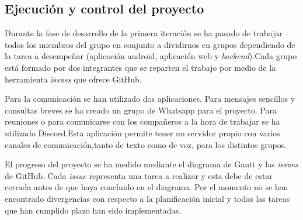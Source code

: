 \documentclass{article}
\begin{document}
\subsection{Ejecución y control del proyecto}

Durante la fase de desarrollo de la primera iteración se ha pasado de trabajar todos los miembros del grupo en conjunto a dividirnos en grupos dependiendo de la tarea a desempeñar (aplicación android, aplicación web y \textit{backend}).Cada grupo está formado por dos integrantes que se reparten el trabajo por medio de la herramienta \textit{issues} que ofrece GitHub.

Para la comunicación se han utilizado dos aplicaciones. Para mensajes sencillos y consultas breves se ha creado un grupo de Whatsapp para el proyecto. Para reuniones o para comunicarse con los compañeros a la hora de trabajar se ha utilizado Discord.Esta aplicación permite tener un servidor propio con varios canales de comunicación,tanto de texto como de voz, para los distintos grupos.

El progreso del proyecto se ha medido mediante el diagrama de Gantt y las \textit{issues} de GitHub. Cada \textit{issue} representa una tarea a realizar y esta debe de estar cerrada antes de que haya concluido en el diagrama. Por el momento no se han encontrado divergencias con respecto a la planificación inicial y todas las tareas que han cumplido plazo han sido implementadas.
\end{document}
